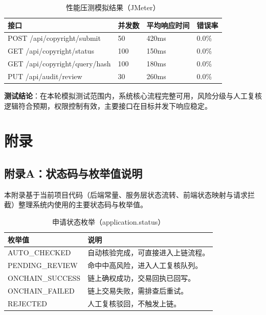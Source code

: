 \documentclass[UTF8,a4paper,12pt]{ctexart}
\begin{document}
\begin{table}[H]
  \centering
  \caption{性能压测模拟结果（JMeter）}
  \begin{tabularx}{0.96\textwidth}{Y p{0.12\textwidth} p{0.20\textwidth} p{0.12\textwidth}}
    \toprule
    接口 & 并发数 & 平均响应时间 & 错误率 \\
    \midrule
    POST /api/copyright/submit & 50 & 420ms & 0.0\% \\
    GET /api/copyright/status & 100 & 150ms & 0.0\% \\
    GET /api/copyright/query/hash & 100 & 180ms & 0.0\% \\
    PUT /api/audit/review & 30 & 260ms & 0.0\% \\
    \bottomrule
  \end{tabularx}
\end{table}

\indent\textbf{测试结论}：在本轮模拟测试范围内，系统核心流程完整可用，风险分级与人工复核逻辑符合预期，权限控制有效，主要接口在目标并发下响应稳定。\par

\newpage
\section*{附录}
\subsection*{附录A：状态码与枚举值说明}
\indent 本附录基于当前项目代码（后端常量、服务层状态流转、前端状态映射与请求拦截）整理系统内使用的主要状态码与枚举值。\par

\begin{table}[H]
  \centering
  \caption{申请状态枚举（application.status）}
  \begin{tabularx}{0.96\textwidth}{p{} Y}
    \toprule
    枚举值 & 说明 \\
    \midrule
    AUTO\_CHECKED & 自动核验完成，可直接进入上链流程。 \\
    PENDING\_REVIEW & 命中中高风险，进入人工复核队列。 \\
    ONCHAIN\_SUCCESS & 链上确权成功，交易回执已回写。 \\
    ONCHAIN\_FAILED & 链上交易失败，需排查后重试。 \\
    REJECTED & 人工复核驳回，不触发上链。 \\
    \bottomrule
  \end{tabularx}
\end{table}
\end{document}
